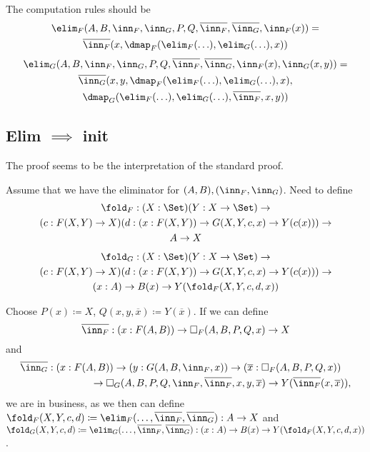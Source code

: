 \documentclass{article}
\begin{document}
The computation rules should be
\begin{multline*}
\elim_F(A, B, \inn_F, \inn_G, P, Q, \overline{\inn_F}, \overline{\inn_G}, \inn_F(x)) = \\
\overline{\inn_F}(x, \dmap_F(\elim_F(\ldots), \elim_G(\ldots), x))
\end{multline*}
\begin{multline*}
\elim_G(A, B, \inn_F, \inn_G, P, Q, \overline{\inn_F}, \overline{\inn_G}, \inn_F(x), \inn_G(x, y)) = \\
\overline{\inn_G}(x, y, \dmap_F(\elim_F(\ldots), \elim_G(\ldots), x),  \\ \dmap_G(\elim_F(\ldots), \elim_G(\ldots), \overline{\inn_F}, x, y))
\end{multline*}

\subsection{Elim $\implies$ init}

The proof seems to be the interpretation of the standard proof.

Assume that we have the eliminator for $(A, B), (\inn_F, \inn_G)$. Need to define
\begin{multline*}
  \fold_F : (X : \Set)(Y : X \to \Set) \to \\
  (c : F(X, Y) \to X)(d : (x : F(X, Y)) \to G(X, Y, c, x) \to Y(c(x))) \to \\
  A \to X
\end{multline*}
\begin{multline*}
  \fold_G : (X : \Set)(Y : X \to \Set) \to \\
  (c : F(X, Y) \to X)(d : (x : F(X, Y)) \to G(X, Y, c, x) \to Y(c(x))) \to \\
  (x : A) \to B(x) \to Y(\fold_F(X, Y, c, d, x))
\end{multline*}

Choose $P(x) \coloneqq X$, $Q(x, y, \overline{x}) \coloneqq
Y(\overline{x})$. If we can define
\[
\overline{\inn_F} : (x : F(A, B)) \to \square_{F}(A, B, P, Q, x) \to X
\]
and
\[
 \begin{multlined}
  \overline{\inn_G} : (x : F(A, B)) \to (y : G(A, B, \inn_F, x)) \to
   (\overline{x} : \square_F(A, B, P, Q, x)) \\ \to
   \square_{G}(A, B, P, Q, \inn_F, \overline{\inn_F}, x, y,
   \overline{x}) \to Y(\overline{\inn_F}(x, \overline{x})),
 \end{multlined}
\]
we are in business, as we then can define $\fold_F(X, Y, c, d)
\coloneqq \elim_F(\ldots, \overline{\inn_F}, \overline{\inn_G}) : A
\to X$ and $\fold_G(X, Y, c, d) \coloneqq \elim_G(\ldots,
\overline{\inn_F}, \overline{\inn_G}) : (x : A) \to B(x) \to
Y(\fold_F(X, Y, c, d, x))$.
\end{document}
